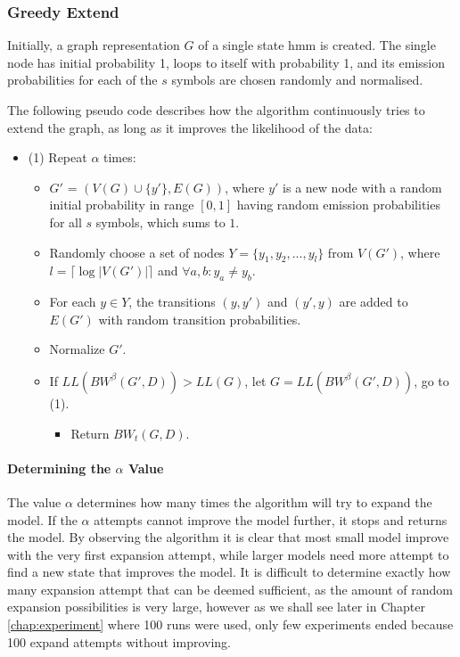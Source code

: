 \subsubsection{Greedy Extend}
Initially, a graph representation $G$ of a single state \gls{hmm} is created. The single node has initial probability 1, loops to itself with probability 1, and its emission probabilities for each of the $s$ symbols are chosen randomly and normalised.

The following pseudo code describes how the algorithm continuously tries to extend the graph, as long as it improves the likelihood of the data:

\begin{itemize}
\item (1) Repeat $\alpha$ times:
	\begin{itemize}
	\item $G'$ = $(V(G) \cup \{y'\}, E(G))$, where $y'$ is a new node with a random initial probability in range $[0, 1]$ having random emission probabilities for all $s$ symbols, which sums to $1$.
	\item Randomly choose a set of nodes $Y = \{y_1, y_2, ... , y_l\}$ from $V(G')$, where $l = \lceil \log |V(G')| \rceil$ and $\forall a,b: y_a \neq y_b$.
	\item For each $y \in Y$, the transitions $(y, y')$ and $(y', y)$ are added to $E(G')$ with random transition probabilities.
	\item Normalize $G'$.
	\item If $LL(BW^{\beta}(G', D)) > LL(G)$, let $G = LL(BW^{\beta}(G', D))$, go to (1).
	\begin{itemize}
		\item Return $BW_t(G, D)$.
	\end{itemize}
	\end{itemize}
\end{itemize}

\paragraph{Determining the $\alpha$ Value}

The value $\alpha$ determines how many times the algorithm will try to expand the model. If the $\alpha$ attempts cannot improve the model further, it stops and returns the model. By observing the algorithm it is clear that most small model improve with the very first expansion attempt, while larger models need more attempt to find a new state that improves the model. It is difficult to determine exactly how many expansion attempt that can be deemed sufficient, as the amount of random expansion possibilities is very large, however as we shall see later in Chapter \ref{chap:experiment} where 100 runs were used, only few experiments ended because 100 expand attempts without improving.

